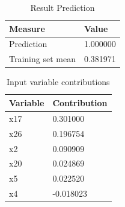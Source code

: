 \documentclass{article}
\begin{document}
\begin{table}[H]
	\centering
	\caption{Result Prediction}
	\label{tab:Result-Prediction}
	\begin{tabular}{|l|l|}
		\hline
		\textbf{Measure}    & \textbf{Value} \\ \hline
		Prediction       	& 1.000000 	  	 \\ \hline
		Training set mean   & 0.381971 	  	 \\ \hline
	\end{tabular}
\end{table}

\begin{table}[H]
	\centering
	\caption{Input variable contributions}
	\label{tab:Variable-Contribution}
	\begin{tabular}{|l|l|}
		\hline
		\textbf{Variable}   & \textbf{Contribution}	\\ \hline
		x17	       			& 0.301000 				\\ \hline
		x26	       			& 0.196754 				\\ \hline
		x2	       			& 0.090909 				\\ \hline
		x20	       			& 0.024869				\\ \hline
		x5	       			& 0.022520 				\\ \hline
		x4	       			& -0.018023 			\\ \hline
	\end{tabular}
\end{table}
\end{document}
